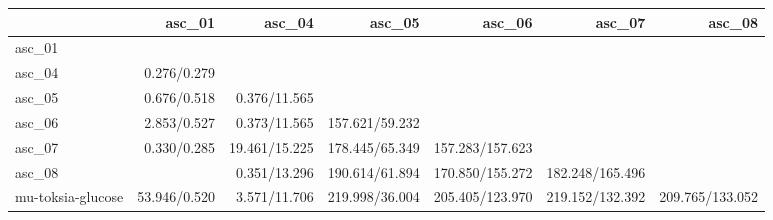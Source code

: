 \begin{tabular}{lrrrrrr}
\toprule
 & asc_01 & asc_04 & asc_05 & asc_06 & asc_07 & asc_08 \\
\midrule
asc_01 &  &  &  &  &  &  \\
asc_04 & 0.276/0.279 &  &  &  &  &  \\
asc_05 & 0.676/0.518 & 0.376/11.565 &  &  &  &  \\
asc_06 & 2.853/0.527 & 0.373/11.565 & 157.621/59.232 &  &  &  \\
asc_07 & 0.330/0.285 & 19.461/15.225 & 178.445/65.349 & 157.283/157.623 &  &  \\
asc_08 &  & 0.351/13.296 & 190.614/61.894 & 170.850/155.272 & 182.248/165.496 &  \\
mu-toksia-glucose & 53.946/0.520 & 3.571/11.706 & 219.998/36.004 & 205.405/123.970 & 219.152/132.392 & 209.765/133.052 \\
\bottomrule
\end{tabular}
